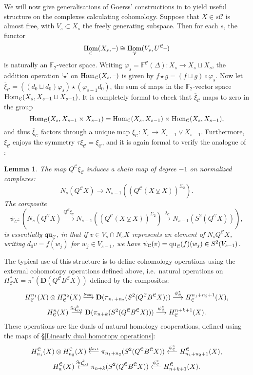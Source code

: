 \documentclass[11pt]{amsart}
\theoremstyle{plain}
\newtheorem{lem}[thm]{Lemma}
\theoremstyle{definition}
\DeclareMathOperator{\Hom}{Hom}
\newcommand{\DASH}{\textup{--}}
\let\phi\varphi
\renewcommand{\to}{\longrightarrow}
\newcommand{\from}{\longleftarrow}
\newcommand{\calV}{\mathcal{V}}
\newcommand{\calc}{\mathcal{C}}
\theoremstyle{plain}
\newcommand{\quadratic}{\textup{qu}}
\newcommand{\ExtCohOp}{\textup{Sq}_\textup{ext}}
\newcommand{\ExtCohProd}{\mu_\textup{ext}}
\newcommand{\F}{\mathbb{F}}
\newcommand{\Ftwo}{\F_2}
\newcommand{\dual}{\mathbf{D}}
\newcommand{\smashcoprod}{\veebar}%
\begin{document}
\begin{Constructing (co)homotopy operations}
We will now give generalisations of Goerss' constructions in \cite[\S5]{MR1089001} to yield useful structure on the complexes calculating cohomology.  Suppose that $X\in s\calc$ is almost free, with $V_s\subset X_s$ the freely generating subspace. Then for each $s$, the functor 
\[\Hom_\calc(X_s,\DASH)\cong \Hom_\calV(V_s,U^\calc\DASH)\]
is naturally an $\Ftwo $-vector space. Writing $\phi_s=\F^\calc(\Delta):X_s\to X_s\sqcup X_s$, the addition operation `$\star$' on $\Hom_\calc(X_s,\DASH)$ is given by $f\star g= (f\sqcup g)\circ\phi_s$. Now let
$\overline{\xi}_\calc=((d_0\sqcup d_0)\phi_s)\star(\phi_{s-1}d_0)$, the sum of maps in the $\Ftwo $-vector space $\textup{Hom}_\calc(X_s,X_{s-1}\sqcup X_{s-1})$. It is completely formal to check that $\overline{\xi}_\calc$ maps to zero in the group
\[\textup{Hom}_\calc(X_s,X_{s-1}\times X_{s-1})=\textup{Hom}_\calc(X_s,X_{s-1})\times \textup{Hom}_\calc(X_s,X_{s-1}),\]
and thus $\overline{\xi}_\calc$ factors through a unique map $\xi_\calc:X_s\to X_{s-1}\smashcoprod X_{s-1}$. Furthermore, $\xi_\calc$ enjoys the symmetry $\tau\xi_\calc=\xi_\calc$, and it is again formal to verify the analogue of \cite[Lemma 5.5]{MR1089001}:
\begin{lem}\label{psi is basically the quadratic part}
The map $Q^\calc\xi_\calc$ induces a chain map of degree $-1$ on normalized complexes:
\[N_s(Q^{\calc}X)\to N_{s-1}((Q^{\calc}(X\smashcoprod X))^{\Sigma_2}).\]
The composite
\[\psi_\calc:\left(N_s(Q^{\calc}X)\overset{Q^\calc\xi_\calc}{\to} N_{s-1}((Q^{\calc}(X\smashcoprod X))^{\Sigma_2})\overset{j_\calc}{\to} N_{s-1}(S^2(Q^{\calc}X))\right),\]
is essentially $\quadratic_\calc$, in that if $v\in V_s\cap N_sX$ represents an element of $N_sQ^\calc X$, writing $d_0v=f(w_j)$ for $w_j\in V_{s-1}$, we have $\psi_\calc(v)=\quadratic_\calc(f)(w_j)\in S^2(V_{s-1})$.
\end{lem}
The typical use of this structure is to define cohomology operations using the external cohomotopy operations defined above, i.e.\ natural operations on $H^*_\calc X=\pi^*(\dual(Q^\calc B^\calc X))$ defined by the composites:
\begin{gather*}
H_\calc^{n_1}(X)\otimes H_\calc^{n_2}(X)\overset{\ExtCohProd}{\to} \dual(\pi_{n_1+n_2}(S^2(Q^\calc B^\calc X)))\overset{\psi_\calc^*}{\to} H_\calc^{n_1+n_2+1}(X),\\
H_\calc^{n}(X)\overset{\ExtCohOp^k}{\to} \dual(\pi_{n+k}(S^2(Q^\calc B^\calc X)))\overset{\psi_\calc^*}{\to} H_\calc^{n+k+1}(X).
\end{gather*}
These operations are the duals of natural homology cooperations, defined using the maps of \S\ref{Linearly dual homotopy operations}:
\begin{gather*}
H^\calc_{n_1}(X)\otimes H^\calc_{n_2}(X)\overset{\ExtCohProd}{\from} \pi_{n_1+n_2}(S^2(Q^\calc B^\calc X))\overset{\psi_\calc^*}{\from} H^\calc_{n_1+n_2+1}(X),\\
H^\calc_{n}(X)\overset{\ExtCohOp^k}{\from} \pi_{n+k}(S^2(Q^\calc B^\calc X))\overset{\psi_\calc^*}{\from} H^\calc_{n+k+1}(X).
\end{gather*}


\end{Constructing (co)homotopy operations}
\end{document}
